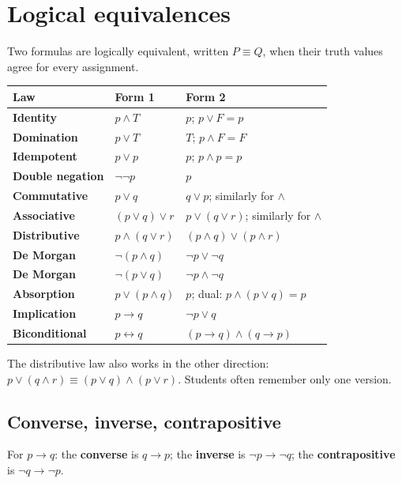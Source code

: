 \documentclass[11pt,a4paper]{article}
\begin{document}
\section{Logical equivalences}

Two formulas are logically equivalent, written $P\equiv Q$, when their truth values agree for every assignment.

\begin{center}\small
\begin{tabularx}{\textwidth}{>{\bfseries}p{} X X}
\toprule Law & Form 1 & Form 2\\\midrule
Identity & $p\land T$ & $p$; \quad $p\lor F=p$\\
Domination & $p\lor T$ & $T$; \quad $p\land F=F$\\
Idempotent & $p\lor p$ & $p$; \quad $p\land p=p$\\
Double negation & $\neg\neg p$ & $p$\\
Commutative & $p\lor q$ & $q\lor p$; similarly for $\land$\\
Associative & $(p\lor q)\lor r$ & $p\lor(q\lor r)$; similarly for $\land$\\
Distributive & $p\land(q\lor r)$ & $(p\land q)\lor(p\land r)$\\
De Morgan & $\neg(p\land q)$ & $\neg p\lor\neg q$\\
De Morgan & $\neg(p\lor q)$ & $\neg p\land\neg q$\\
Absorption & $p\lor(p\land q)$ & $p$; dual: $p\land(p\lor q)=p$\\
Implication & $p\to q$ & $\neg p\lor q$\\
Biconditional & $p\leftrightarrow q$ & $(p\to q)\land(q\to p)$\\
\end{tabularx}
\end{center}

\begin{dangerbox}
The distributive law also works in the other direction: $p\lor(q\land r)\equiv(p\lor q)\land(p\lor r)$. Students often remember only one version.
\end{dangerbox}

\subsection{Converse, inverse, contrapositive}
For $p\to q$: the \textbf{converse} is $q\to p$; the \textbf{inverse} is $\neg p\to\neg q$; the \textbf{contrapositive} is $\neg q\to\neg p$.
\end{document}
